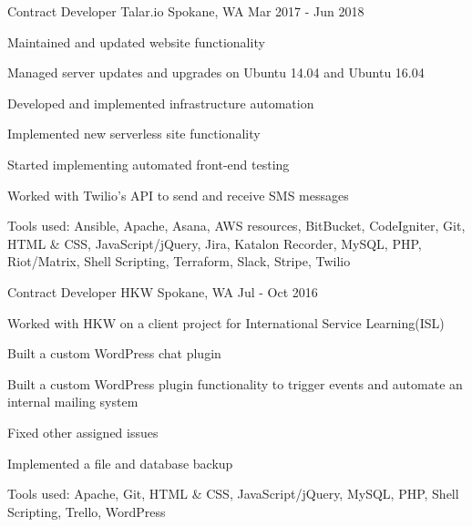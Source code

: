 

\begin{cventries}

  \cventry
    {Contract Developer} %
    {Talar.io} %
    {Spokane, WA} %
    {Mar 2017 - Jun 2018} %
    {
      \begin{cvitems} %
        \item {Maintained and updated website functionality}
        \item {Managed server updates and upgrades on Ubuntu 14.04 and Ubuntu 16.04}
        \item {Developed and implemented infrastructure automation}
        \item {Implemented new serverless site functionality}
        \item {Started implementing automated front-end testing}
        \item {Worked with Twilio's API to send and receive SMS messages}
        \item {Tools used: Ansible, Apache, Asana, AWS resources, BitBucket, CodeIgniter, Git, HTML \& CSS, JavaScript/jQuery, Jira, Katalon Recorder, MySQL, PHP, Riot/Matrix, Shell Scripting, Terraform, Slack, Stripe, Twilio}
      \end{cvitems}
    }

  \cventry
    {Contract Developer} %
    {HKW} %
    {Spokane, WA} %
    {Jul - Oct 2016} %
    {
      \begin{cvitems} %
        \item {Worked with HKW on a client project for International Service Learning(ISL)}
        \item {Built a custom WordPress chat plugin}
        \item {Built a custom WordPress plugin functionality to trigger events and automate an internal mailing system}
        \item {Fixed other assigned issues}
        \item {Implemented a file and database backup}
        \item {Tools used: Apache, Git, HTML \& CSS, JavaScript/jQuery, MySQL, PHP, Shell Scripting, Trello, WordPress}
      \end{cvitems}
    }


\end{cventries}
